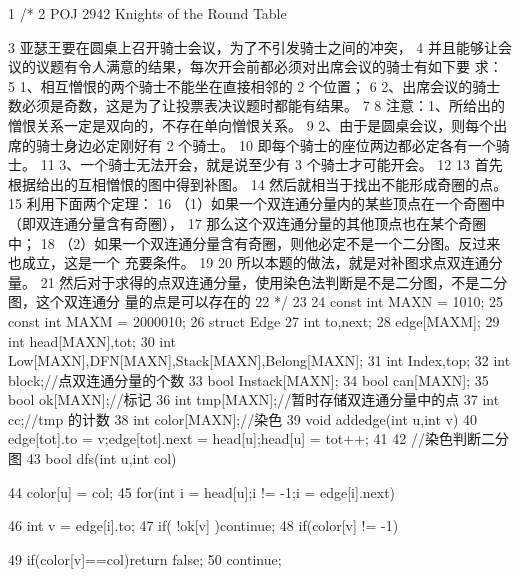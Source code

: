 \documentclass[11pt]{article}
\begin{document}
\begin{Code}
1 /*
2 POJ 2942 Knights of the Round Table


 3 亚瑟王要在圆桌上召开骑士会议，为了不引发骑士之间的冲突，
 4 并且能够让会议的议题有令人满意的结果，每次开会前都必须对出席会议的骑士有如下要
      求：
 5 1、相互憎恨的两个骑士不能坐在直接相邻的 2 个位置；
 6 2、出席会议的骑士数必须是奇数，这是为了让投票表决议题时都能有结果。
 7
 8 注意：1、所给出的憎恨关系一定是双向的，不存在单向憎恨关系。
 9 2、由于是圆桌会议，则每个出席的骑士身边必定刚好有 2 个骑士。
10 即每个骑士的座位两边都必定各有一个骑士。
11 3、一个骑士无法开会，就是说至少有 3 个骑士才可能开会。
12
13 首先根据给出的互相憎恨的图中得到补图。
14 然后就相当于找出不能形成奇圈的点。
15 利用下面两个定理：
16 （1）如果一个双连通分量内的某些顶点在一个奇圈中（即双连通分量含有奇圈），
17 那么这个双连通分量的其他顶点也在某个奇圈中；
18 （2）如果一个双连通分量含有奇圈，则他必定不是一个二分图。反过来也成立，这是一个
      充要条件。
19
20 所以本题的做法，就是对补图求点双连通分量。
21 然后对于求得的点双连通分量，使用染色法判断是不是二分图，不是二分图，这个双连通分
      量的点是可以存在的
22 */
23
24 const int MAXN = 1010;
25 const int MAXM = 2000010;
26 struct Edge{
27     int to,next;
28 }edge[MAXM];
29 int head[MAXN],tot;
30 int Low[MAXN],DFN[MAXN],Stack[MAXN],Belong[MAXN];
31 int Index,top;
32 int block;//点双连通分量的个数
33 bool Instack[MAXN];
34 bool can[MAXN];
35 bool ok[MAXN];//标记
36 int tmp[MAXN];//暂时存储双连通分量中的点
37 int cc;//tmp 的计数
38 int color[MAXN];//染色
39 void addedge(int u,int v){
40     edge[tot].to = v;edge[tot].next = head[u];head[u] = tot++;
41 }
42 //染色判断二分图
43 bool dfs(int u,int col){
44     color[u] = col;
45     for(int i = head[u];i != -1;i = edge[i].next){
46         int v = edge[i].to;
47         if( !ok[v] )continue;
48         if(color[v] != -1){
49              if(color[v]==col)return false;
50              continue;


}}}
\end{Code}
\end{document}
